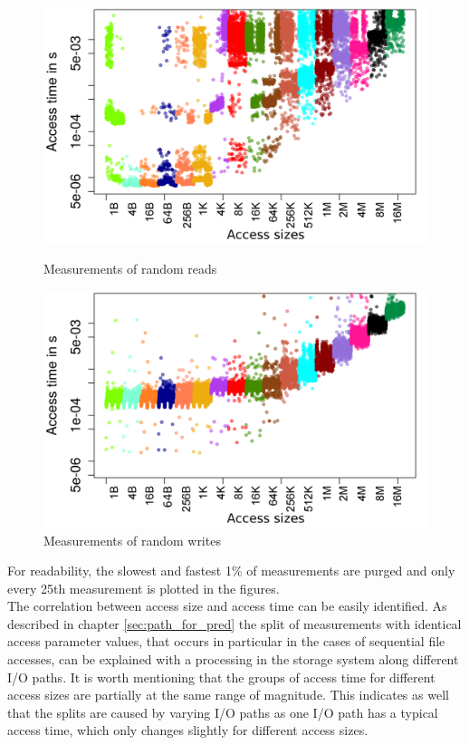 \documentclass{superfri}
\begin{document}
	\begin{figure}[t]
		\centering
		\begin{minipage}[b]{0.47\textwidth}
			\includegraphics[width=\textwidth]{src/plot_SizeSorted_log_read_rnd.png}
			\caption{Measurements of random reads}
			\label{read_rnd}
		\end{minipage}
		\hfill
		\begin{minipage}[b]{0.47\textwidth}
			\includegraphics[width=\textwidth]{src/plot_SizeSorted_log_write_rnd.png}
			\caption{Measurements of random writes}
			\label{write_rnd}
		\end{minipage}
	\end{figure}
	
	For readability, the slowest and fastest 1\% of measurements are purged and only every 25th measurement is plotted in the figures.\\
	The correlation between access size and access time can be easily identified.
	As described in chapter \ref{sec:path_for_pred} the split of measurements with identical access parameter values, that occurs in particular in the cases of sequential file accesses, can be explained with a processing in the storage system along different I/O paths.
	It is worth mentioning that the groups of access time for different access sizes are partially at the same range of magnitude.
	This indicates as well that the splits are caused by varying I/O paths as one I/O path has a typical access time, which only changes slightly for different access sizes.
	
\end{document}
